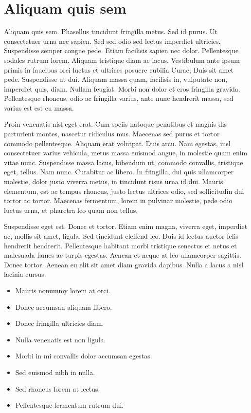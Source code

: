 \documentclass[printmode]{mgr}
\begin{document}
\section{Aliquam quis sem}
Aliquam quis sem. Phasellus tincidunt fringilla metus. Sed id
purus. Ut consectetuer urna nec sapien. Sed sed odio sed lectus
imperdiet ultricies. Suspendisse semper congue pede. Etiam facilisis
sapien nec dolor. Pellentesque sodales rutrum lorem. Aliquam tristique
diam ac lacus. Vestibulum ante ipsum primis in faucibus orci luctus et
ultrices posuere cubilia Curae; Duis sit amet pede. Suspendisse ut
dui. Aliquam massa quam, facilisis in, vulputate non, imperdiet quis,
diam. Nullam feugiat. Morbi non dolor et eros fringilla
gravida. Pellentesque rhoncus, odio ac fringilla varius, ante nunc
hendrerit massa, sed varius est est eu massa.

Proin venenatis nisl eget erat. Cum sociis natoque penatibus et magnis
dis parturient montes, nascetur ridiculus mus. Maecenas sed purus et
tortor commodo pellentesque. Aliquam erat volutpat. Duis arcu. Nam
egestas, nisl consectetuer varius vehicula, metus massa euismod augue,
in molestie quam enim vitae nunc. Suspendisse massa lacus, bibendum
ut, commodo convallis, tristique eget, tellus. Nam nunc. Curabitur ac
libero. In fringilla, dui quis ullamcorper molestie, dolor justo
viverra metus, in tincidunt risus urna id dui. Mauris elementum, est
ac tempus rhoncus, justo lectus ultrices odio, sed sollicitudin dui
tortor ac tortor. Maecenas fermentum, lorem in pulvinar molestie, pede
odio luctus urna, et pharetra leo quam non tellus.

Suspendisse eget est. Donec et tortor. Etiam enim magna, viverra eget,
imperdiet ac, mollis sit amet, ligula. Sed tincidunt eleifend
leo. Duis id lectus auctor felis hendrerit hendrerit. Pellentesque
habitant morbi tristique senectus et netus et malesuada fames ac
turpis egestas. Aenean et neque at leo ullamcorper sagittis. Donec
tortor. Aenean eu elit sit amet diam gravida dapibus. Nulla a lacus a
nisl lacinia cursus.

\begin{itemize}
\item Mauris nonummy lorem at orci.
\item Donec accumsan aliquam libero.
\item Donec fringilla ultricies diam.
\item Nulla venenatis est non ligula.
\item Morbi in mi convallis dolor accumsan egestas.
\item Sed euismod nibh in nulla.
\item Sed rhoncus lorem at lectus.
\item Pellentesque fermentum rutrum dui.
\end{itemize}
\end{document}
